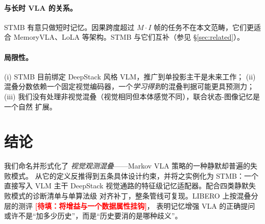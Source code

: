 \documentclass[11pt]{ctexart}
\newcommand{\todo}[1]{\textcolor{red}{\textbf{[待填：#1]}}}
\begin{document}
\paragraph{与长时 VLA 的关系。}
STMB 有意只做短时记忆。因果跨度超过 $M \cdot I$ 帧的任务不在本文范畴，它们更适合
MemoryVLA、LoLA 等架构。STMB 与它们互补（参见 \S\ref{sec:related}）。

\paragraph{局限性。}
(i) STMB 目前绑定 DeepStack 风格 VLM，推广到单投影主干是未来工作；
(ii) 混叠分数依赖一个固定视觉编码器，一个\emph{学习得到}的混叠判据可能更具预测力；
(iii) 我们没有处理非视觉混叠（视觉相同但本体感觉不同），联合状态-图像记忆是一个自然
扩展。

\section{结论}

我们命名并形式化了 \emph{视觉观测混叠}——Markov VLA 策略的一种静默却普遍的失败模式。
从它的定义反推得到五条具体设计约束，并将之实例化为 STMB：一个直接写入 VLM 主干
DeepStack 视觉通路的特征级记忆适配器。配合四类静默失败模式的诊断清单与单算法级
对齐补丁，整条管线可复现。LIBERO 上按混叠分层的测评 \todo{将增益与一个数据属性挂钩}，
表明记忆增强 VLA 的正确提问或许不是“加多少历史”，而是“历史要消的是哪种歧义”。
\end{document}
